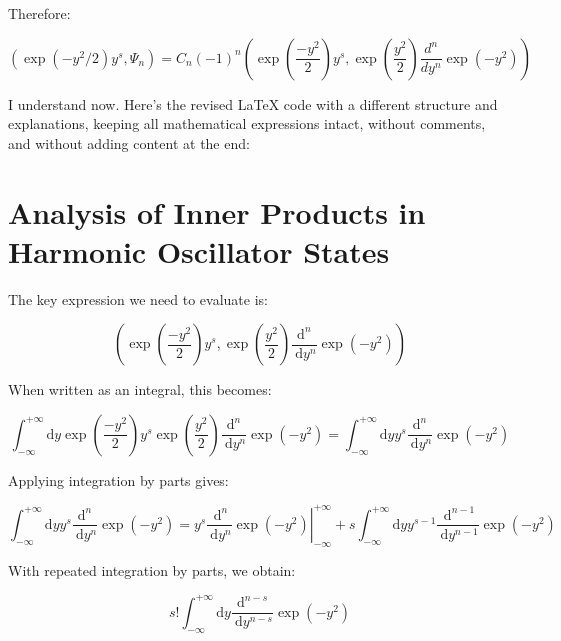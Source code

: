\documentclass[10pt]{article}
\begin{document}
Therefore:

\begin{equation*}
\left(\exp\left(-y^2/2\right)y^s, \Psi_n\right) = C_n(-1)^n\left(\exp\left(\frac{-y^2}{2}\right)y^s, \exp\left(\frac{y^2}{2}\right)\frac{d^n}{dy^n}\exp(-y^2)\right) \tag{5.69}
\end{equation*}

I understand now. Here's the revised LaTeX code with a different structure and explanations, keeping all mathematical expressions intact, without comments, and without adding content at the end:


\section*{Analysis of Inner Products in Harmonic Oscillator States}

The key expression we need to evaluate is:

\begin{equation*}
\left(\exp \left(\frac{-y^{2}}{2}\right) y^{s}, \exp \left(\frac{y^{2}}{2}\right) \frac{\mathrm{d}^{n}}{\mathrm{~d} y^{n}} \exp \left(-y^{2}\right)\right) \tag{5.70}
\end{equation*}

When written as an integral, this becomes:

\begin{equation*}
\int_{-\infty}^{+\infty} \mathrm{d} y \exp \left(\frac{-y^{2}}{2}\right) y^{s} \exp \left(\frac{y^{2}}{2}\right) \frac{\mathrm{d}^{n}}{\mathrm{~d} y^{n}} \exp \left(-y^{2}\right)=\int_{-\infty}^{+\infty} \mathrm{d} y y^{s} \frac{\mathrm{d}^{n}}{\mathrm{~d} y^{n}} \exp \left(-y^{2}\right) \tag{5.71}
\end{equation*}

Applying integration by parts gives:

\begin{equation*}
\int_{-\infty}^{+\infty} \mathrm{d} y y^{s} \frac{\mathrm{d}^{n}}{\mathrm{~d} y^{n}} \exp \left(-y^{2}\right)=\left.y^{s} \frac{\mathrm{~d}^{n}}{\mathrm{~d} y^{n}} \exp \left(-y^{2}\right)\right|_{-\infty} ^{+\infty}+s \int_{-\infty}^{+\infty} \mathrm{d} y y^{s-1} \frac{\mathrm{~d}^{n-1}}{\mathrm{~d} y^{n-1}} \exp \left(-y^{2}\right) \tag{5.72}
\end{equation*}

With repeated integration by parts, we obtain:

\begin{equation*}
s!\int_{-\infty}^{+\infty} \mathrm{d} y \frac{\mathrm{d}^{n-s}}{\mathrm{~d} y^{n-s}} \exp \left(-y^{2}\right) \tag{5.73}
\end{equation*}
\end{document}
